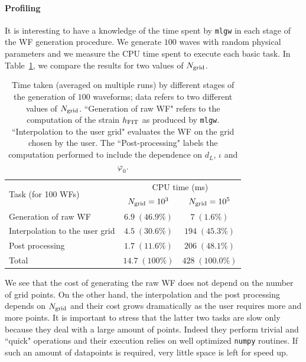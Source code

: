 \paragraph{Profiling}
It is interesting to have a knowledge of the time spent by \texttt{mlgw} 
in each stage of the WF generation procedure. We generate $100$ waves with random 
physical parameters and we measure the CPU time spent to execute each basic task.
In Table~\ref{tab:profiling}, we compare the results for two values of $N_{\rm grid}$.
\begin{table}
	\caption{
Time taken (averaged on multiple runs) by different stages of the generation of $100$ waveforms;
data refers to two different values of $N_{\rm grid}$.
``Generation of raw WF" refers to the computation of the strain $h_{\rm FIT}$ as produced by \texttt{mlgw}. 
``Interpolation to the user grid" evaluates the WF on the grid chosen by the user. 
The ``Post-processing" labels the computation performed to include the dependence on $d_L$, $\iota$ and $\varphi_0$.
}
	\label{tab:profiling}
	\def\arraystretch{1.5}
	\begin{ruledtabular}
	\begin{tabular}{ l c c }
		\multirow{2}{*}{Task (for 100 WFs)}& \multicolumn{2}{c}{CPU time (ms)}\\
			&$N_{\rm grid} = 10^3$	& $N_{\rm grid} = 10^5$\\
	\hline \hline
		 Generation of raw WF 			& $6.9 \; (46.9\%)$	& $7 \; (1.6\%)$ \\ 
	\hline
		 Interpolation to the user grid & $4.5 \; (30.6\%)$	& $194 \; (45.3\%)$ \\ 
	\hline
		 Post processing 				& $1.7 \; (11.6\%)$	& $206 \; (48.1\%)$ \\
	\hline
		 Total							& $14.7 \; (100\%)$ &  $428 \; (100.0\%)$ \\
	\end{tabular}
	\end{ruledtabular}
\end{table}
We see that the cost of generating the raw WF does not depend on the number of grid points. 
On the other hand, the interpolation and the post processing depends on $N_{\rm grid}$ and their 
cost grows dramatically as the user requires more and more points. It is important to stress that 
the latter two tasks are slow only because they deal with a large amount of points. Indeed they perform 
trivial and ``quick" operations and their execution relies on well optimized \texttt{numpy} routines.
If such an amount of datapoints is required, very little space is left for speed up.



